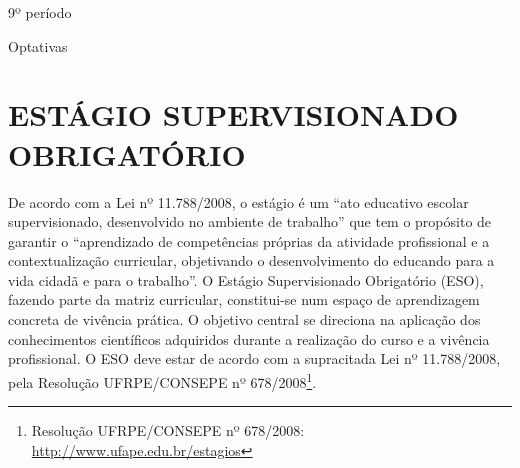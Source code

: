 \documentclass[
	12pt,				%
	openright,			%
  oneside,     %
	a4paper,			%
	chapter=TITLE,		%
	english,			%
	french,				%
	spanish,			%
	brazil				%
	]{abntex2}
\begin{document}
\vspace*{10cm}

\begin{center}
    {\huge 9º período}
\end{center}







\vspace*{10cm}

\begin{center}
    {\huge Optativas}
\end{center}



%
%



\chapter{ESTÁGIO SUPERVISIONADO OBRIGATÓRIO}
\label{cap_eso}

De acordo com a Lei nº 11.788/2008, o estágio é um ``ato educativo escolar supervisionado, desenvolvido no ambiente de trabalho'' que tem o propósito de garantir o “aprendizado de competências próprias da atividade profissional e a contextualização curricular, objetivando o desenvolvimento do educando para a vida cidadã e para o trabalho”. O Estágio Supervisionado Obrigatório (ESO), fazendo parte da matriz curricular, constitui-se num espaço de aprendizagem concreta de vivência prática. O objetivo central se direciona na aplicação dos conhecimentos científicos adquiridos durante a realização do curso e a vivência profissional. O ESO deve estar de acordo com a supracitada Lei nº 11.788/2008, pela Resolução UFRPE/CONSEPE nº 678/2008\footnote{Resolução UFRPE/CONSEPE nº 678/2008: \url{http://www.ufape.edu.br/estagios}}.
\end{document}
